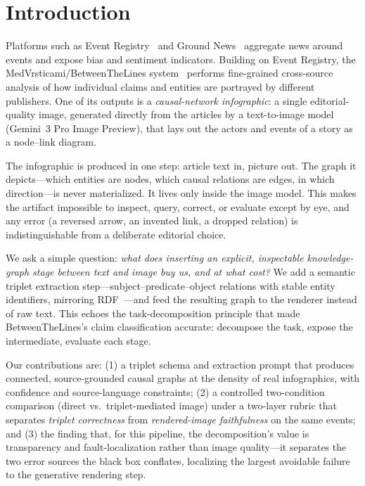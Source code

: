 \documentclass[sigconf,natbib=false, language=english]{acmart}
\begin{document}
\section{Introduction}
Platforms such as Event Registry~\cite{leban2014event,eventregistry} and Ground News~\cite{groundnews} aggregate news around events and expose bias and sentiment indicators. Building on Event Registry, the MedVrsticami/BetweenTheLines system~\cite{betweenthelines} performs fine-grained cross-source analysis of how individual claims and entities are portrayed by different publishers. One of its outputs is a \emph{causal-network infographic}: a single editorial-quality image, generated directly from the articles by a text-to-image model (Gemini~3 Pro Image Preview), that lays out the actors and events of a story as a node--link diagram.

The infographic is produced in one step: article text in, picture out. The graph it depicts---which entities are nodes, which causal relations are edges, in which direction---is never materialized. It lives only inside the image model. This makes the artifact impossible to inspect, query, correct, or evaluate except by eye, and any error (a reversed arrow, an invented link, a dropped relation) is indistinguishable from a deliberate editorial choice.

We ask a simple question: \emph{what does inserting an explicit, inspectable knowledge-graph stage between text and image buy us, and at what cost?} We add a semantic triplet extraction step---subject--predicate--object relations with stable entity identifiers, mirroring RDF~\cite{rdf11}---and feed the resulting graph to the renderer instead of raw text. This echoes the task-decomposition principle that made BetweenTheLines's claim classification accurate: decompose the task, expose the intermediate, evaluate each stage.

Our contributions are: (1) a triplet schema and extraction prompt that produces connected, source-grounded causal graphs at the density of real infographics, with confidence and source-language constraints; (2) a controlled two-condition comparison (direct vs.\ triplet-mediated image) under a two-layer rubric that separates \emph{triplet correctness} from \emph{rendered-image faithfulness} on the same events; and (3) the finding that, for this pipeline, the decomposition's value is transparency and fault-localization rather than image quality---it separates the two error sources the black box conflates, localizing the largest avoidable failure to the generative rendering step.
\end{document}
